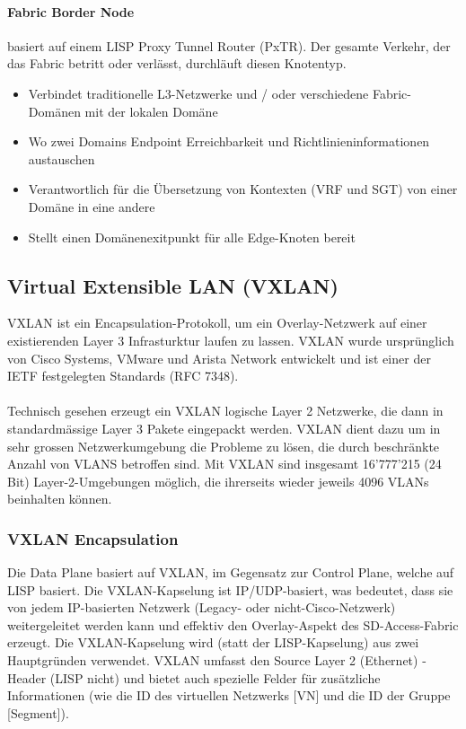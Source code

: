 \paragraph{Fabric Border Node} basiert auf einem LISP Proxy Tunnel Router (PxTR). Der gesamte Verkehr, der das Fabric betritt oder verlässt, durchläuft diesen Knotentyp.
\begin{itemize}
	\item Verbindet traditionelle L3-Netzwerke und / oder verschiedene Fabric-Domänen mit der lokalen Domäne
	\item Wo zwei Domains Endpoint Erreichbarkeit und Richtlinieninformationen austauschen
	\item Verantwortlich für die Übersetzung von Kontexten (VRF und SGT) von einer Domäne in eine andere
	\item Stellt einen Domänenexitpunkt für alle Edge-Knoten bereit
\end{itemize}

\subsection{Virtual Extensible LAN (VXLAN)}
VXLAN ist ein Encapsulation-Protokoll, um ein Overlay-Netzwerk auf einer existierenden Layer 3 Infrasturktur laufen zu lassen. VXLAN wurde ursprünglich von Cisco Systems, VMware und Arista Network entwickelt und ist einer der IETF festgelegten Standards (RFC 7348). \cite{rfc-7348} \\
\\
Technisch gesehen erzeugt ein VXLAN logische Layer 2 Netzwerke, die dann in standardmässige Layer 3 Pakete eingepackt werden. VXLAN dient dazu um in sehr grossen Netzwerkumgebung die Probleme zu lösen, die durch beschränkte Anzahl von VLANS betroffen sind. Mit VXLAN sind insgesamt 16’777’215 (24 Bit) Layer-2-Umgebungen möglich, die ihrerseits wieder jeweils 4096 VLANs beinhalten können. 

\subsubsection{VXLAN Encapsulation}
Die Data Plane basiert auf VXLAN, im Gegensatz zur Control Plane, welche auf LISP basiert. Die VXLAN-Kapselung ist IP/UDP-basiert, was bedeutet, dass sie von jedem IP-basierten Netzwerk (Legacy- oder nicht-Cisco-Netzwerk) weitergeleitet werden kann und effektiv den Overlay-Aspekt des SD-Access-Fabric erzeugt. Die VXLAN-Kapselung wird (statt der LISP-Kapselung) aus zwei Hauptgründen verwendet. VXLAN umfasst den Source Layer 2 (Ethernet) -Header (LISP nicht) und bietet auch spezielle Felder für zusätzliche Informationen (wie die ID des virtuellen Netzwerks [VN] und die ID der Gruppe [Segment]). \cite{sda-whitepaper}\\

